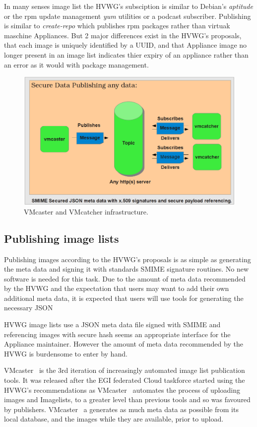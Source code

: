\documentclass{llncs_Ibergrid2013}
\begin{document}
In many senses image list the HVWG's subsciption is similar to Debian's \textit{aptitude} or the rpm update management \textit{yum} utilities or a podcast subscriber. Publishing is similar to \textit{create-repo} which publishes rpm packages rather than virtuak maschine Appliances. But 2 major differences exist in the HVWG's proposals, that each image is uniquely identified by a UUID, and that Appliance image no longer present in an image list indicates thier expiry of an appliance rather than an error as it would with package management.

\begin{figure}[h]
\centering
\includegraphics[width=1\textwidth]{vmcaster_vmcatcher.png}
\caption{VMcaster and VMcatcher infrastructure.}
\label{fig:infrastructure}
\end{figure}

\subsection{Publishing image lists}
Publishing images according to the HVWG's proposals is as simple as generating the meta data and signing it with standards SMIME signature routines. No new software is needed for this task. Due to the amount of meta data recommended by the HVWG and the expectation that users may want to add their own additional meta data, it is expected that users will use tools for generating the necessary JSON 

HVWG image lists use a JSON meta data file signed with SMIME and referencing images with secure hash seems an appropriate interface for the Appliance maintainer. However the amount of meta data recommended by the HVWG is burdensome to enter by hand.
 
VMcaster~\cite{vmcaster} is the 3rd iteration of increasingly automated image list publication tools. It was released after the EGI federated Cloud taskforce started using the HVWG's recommendations as VMcaster~\cite{vmcaster} automates the process of uploading images and Imagelists, to a greater level than previous tools and so was favoured by publishers. VMcaster~\cite{vmcaster} a generates as much meta data as possible from its local database, and the images while they are available, prior to upload.
\end{document}
